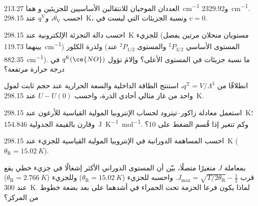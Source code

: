 \begin{exercise}[$\star\star$]\label{exo:b3:partition-functions:5}
العددان الموجيان للانتقالين الأساسيين للجزيئين  و هما \qty{213.27}{cm^{-1}} 
و\qty{2329.92}{cm^{-1}}. احسب $\theta_{\mathrm V}$، و$q^{\mathrm V}$ عند \qty{298.15}{K}، ونسبة الجزيئات
التي ليست في $v = 0$.
\end{exercise}

\begin{exercise}[$\star\star$]\label{exo:b3:partition-functions:6}
احسب دالة التجزئة الإلكترونية عند \qty{298.15}{K} للجزيء  (مستويان منحلان
مرتين يفصل بينهما \qty{119.73}{cm^{-1}}) ولذرة الكلور (المستوى الأساسي ${}^2P_{3/2}$
والمستوى ${}^2P_{1/2}$ عند \qty{882.35}{cm^{-1}}). ما نسبة جزيئات  في
المستوى الأعلى؟ وإلامَ تؤول $q^{\mathrm E}(\ce{NO})$ في درجة حرارة مرتفعة؟
\end{exercise}

\begin{exercise}[$\star\star$]\label{exo:b3:partition-functions:7}
انطلاقًا من $q^{\mathrm T} = V/\Lambda^3$، استنتج الطاقة الداخلية والسعة الحرارية عند
حجم ثابت لمول واحد من غاز مثالي أحادي الذرة، واحسب $U - U(0)$ عند
\qty{298.15}{K}.
\end{exercise}

\begin{exercise}[$\star\star$]\label{exo:b3:partition-functions:8}
استعمل معادلة زاكور--تيترود لحساب الإنتروبيا المولية القياسية
للأرغون عند \qty{298.15}{K}؛ وقارن بالقيمة الجدولية
\qty{154.846}{J.K^{-1}.mol^{-1}}. وكم تتغير إذا قُسم الضغط على 10؟
\end{exercise}

\begin{exercise}[$\star\star$]\label{exo:b3:partition-functions:9}
احسب المساهمة الدورانية في الإنتروبيا المولية القياسية للجزيء
 عند \qty{298.15}{K} ($\theta_{\mathrm R} = \qty{15.02}{K}$).
\end{exercise}

\begin{exercise}[$\star\star\star$]\label{exo:b3:partition-functions:10}
بمعاملة $J$ متغيرًا متصلًا، بيّن أن المستوى الدوراني الأكثر إشغالًا في
جزيء خطي يقع قرب $J_{\max} = \sqrt{T/2\theta_{\mathrm R}} - \frac12$. واحسبه للجزيء 
($\theta_{\mathrm R} = \qty{15.02}{K}$) وللجزيء  ($\theta_{\mathrm R} = \qty{2.766}{K}$) عند \qty{300}{K}. لماذا يكون
فرعا الحزمة تحت الحمراء في أشدهما على بعد بضعة خطوط من المركز؟
\end{exercise}

